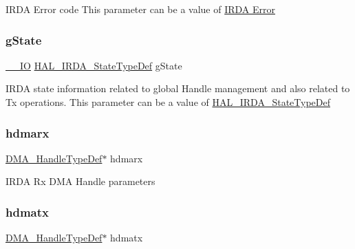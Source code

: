 I\+R\+DA Error code This parameter can be a value of \hyperlink{group___i_r_d_a___error}{I\+R\+DA Error} \mbox{\label{struct_i_r_d_a___handle_type_def_a5075d3e29bb3a5fba531c19a779dec46}} 
\subsubsection{\texorpdfstring{g\+State}{gState}}
{\footnotesize\ttfamily \hyperlink{core__sc300_8h_aec43007d9998a0a0e01faede4133d6be}{\+\_\+\+\_\+\+IO} \hyperlink{group___i_r_d_a___exported___types_gab3e65b75c9d4ae39bc50a31222509e1e}{H\+A\+L\+\_\+\+I\+R\+D\+A\+\_\+\+State\+Type\+Def} g\+State}

I\+R\+DA state information related to global Handle management and also related to Tx operations. This parameter can be a value of \hyperlink{group___i_r_d_a___exported___types_gab3e65b75c9d4ae39bc50a31222509e1e}{H\+A\+L\+\_\+\+I\+R\+D\+A\+\_\+\+State\+Type\+Def} \mbox{\label{struct_i_r_d_a___handle_type_def_abd0aeec20298a55d89a440320e35634f}} 
\subsubsection{\texorpdfstring{hdmarx}{hdmarx}}
{\footnotesize\ttfamily \hyperlink{group___d_m_a___exported___types_ga92b907d56a9c29b93d46782a7a04f91e}{D\+M\+A\+\_\+\+Handle\+Type\+Def}$\ast$ hdmarx}

I\+R\+DA Rx D\+MA Handle parameters \mbox{\label{struct_i_r_d_a___handle_type_def_a33e13c28b1a70e6164417abb026d7a22}} 
\subsubsection{\texorpdfstring{hdmatx}{hdmatx}}
{\footnotesize\ttfamily \hyperlink{group___d_m_a___exported___types_ga92b907d56a9c29b93d46782a7a04f91e}{D\+M\+A\+\_\+\+Handle\+Type\+Def}$\ast$ hdmatx}

